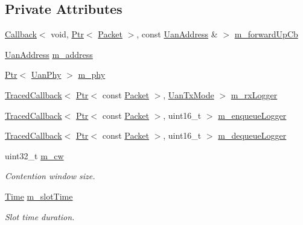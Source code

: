 \subsection*{Private Attributes}
\begin{DoxyCompactItemize}
\item 
\hyperlink{classns3_1_1Callback}{Callback}$<$ void, \hyperlink{classns3_1_1Ptr}{Ptr}$<$ \hyperlink{classns3_1_1Packet}{Packet} $>$, const \hyperlink{classns3_1_1UanAddress}{Uan\+Address} \& $>$ \hyperlink{classns3_1_1UanMacCw_abf0c52816b6b6dc01c6760a4d9393a34}{m\+\_\+forward\+Up\+Cb}
\item 
\hyperlink{classns3_1_1UanAddress}{Uan\+Address} \hyperlink{classns3_1_1UanMacCw_afd22415ba2abfd66f830d9adee47b43e}{m\+\_\+address}
\item 
\hyperlink{classns3_1_1Ptr}{Ptr}$<$ \hyperlink{classns3_1_1UanPhy}{Uan\+Phy} $>$ \hyperlink{classns3_1_1UanMacCw_adab4ab8156181e2562419770378d6fe4}{m\+\_\+phy}
\item 
\hyperlink{classns3_1_1TracedCallback}{Traced\+Callback}$<$ \hyperlink{classns3_1_1Ptr}{Ptr}$<$ const \hyperlink{classns3_1_1Packet}{Packet} $>$, \hyperlink{classns3_1_1UanTxMode}{Uan\+Tx\+Mode} $>$ \hyperlink{classns3_1_1UanMacCw_a31e115318fa3de0a4172a4b40144e464}{m\+\_\+rx\+Logger}
\item 
\hyperlink{classns3_1_1TracedCallback}{Traced\+Callback}$<$ \hyperlink{classns3_1_1Ptr}{Ptr}$<$ const \hyperlink{classns3_1_1Packet}{Packet} $>$, uint16\+\_\+t $>$ \hyperlink{classns3_1_1UanMacCw_a16aefbcad66a139dd720b556aa3deb61}{m\+\_\+enqueue\+Logger}
\item 
\hyperlink{classns3_1_1TracedCallback}{Traced\+Callback}$<$ \hyperlink{classns3_1_1Ptr}{Ptr}$<$ const \hyperlink{classns3_1_1Packet}{Packet} $>$, uint16\+\_\+t $>$ \hyperlink{classns3_1_1UanMacCw_ae4e44147f4b565d509706be9cb9b4408}{m\+\_\+dequeue\+Logger}
\item 
uint32\+\_\+t \hyperlink{classns3_1_1UanMacCw_adeaa1556fd593b364a2cba5729d48ab9}{m\+\_\+cw}
\begin{DoxyCompactList}\small\item\em Contention window size. \end{DoxyCompactList}\item 
\hyperlink{classns3_1_1Time}{Time} \hyperlink{classns3_1_1UanMacCw_a8fa0ad746b687dda61ccfa3f5bab975b}{m\+\_\+slot\+Time}
\begin{DoxyCompactList}\small\item\em Slot time duration. \end{DoxyCompactList}\item 

\end{DoxyCompactItemize}
